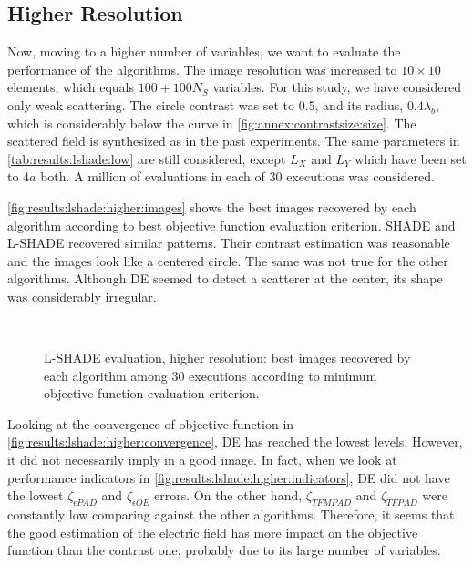 		\subsection{Higher Resolution}\label{chap:results:lshade:higher}
		
			Now, moving to a higher number of variables, we want to evaluate the performance of the algorithms. The image resolution was increased to $10\times10$ elements, which equals $100 + 100N_S$ variables. For this study, we have considered only weak scattering. The circle contrast was set to $0.5$, and its radius, $0.4\lambda_b$, which is considerably below the curve in \autoref{fig:annex:contrastsize:size}. The scattered field is synthesized as in the past experiments. The same parameters in \autoref{tab:results:lshade:low} are still considered, except $L_X$ and $L_Y$ which have been set to $4a$ both. A million of evaluations in each of 30 executions was considered.
			
			\autoref{fig:results:lshade:higher:images} shows the best images recovered by each algorithm according to best objective function evaluation criterion. SHADE and L-SHADE recovered similar patterns. Their contrast estimation was reasonable and the images look like a centered circle. The same was not true for the other algorithms. Although DE seemed to detect a scatterer at the center, its shape was considerably irregular.
			
			\begin{figure}
				\centering
				 \\
				\caption[L-SHADE evaluation, higher resolution: best recovered images.]{L-SHADE evaluation, higher resolution: best images recovered by each algorithm among 30 executions according to minimum objective function evaluation criterion.}
				\label{fig:results:lshade:higher:images}
			\end{figure}
		
			Looking at the convergence of objective function in \autoref{fig:results:lshade:higher:convergence}, DE has reached the lowest levels. However, it did not necessarily imply in a good image. In fact, when we look at performance indicators in \autoref{fig:results:lshade:higher:indicators}, DE did not have the lowest $\zeta_{\epsilon PAD}$ and $\zeta_{\epsilon OE}$ errors. On the other hand, $\zeta_{TFMPAD}$ and $\zeta_{TFPAD}$ were constantly low comparing against the other algorithms. Therefore, it seems that the good estimation of the electric field has more impact on the objective function than the contrast one, probably due to its large number of variables.
		
